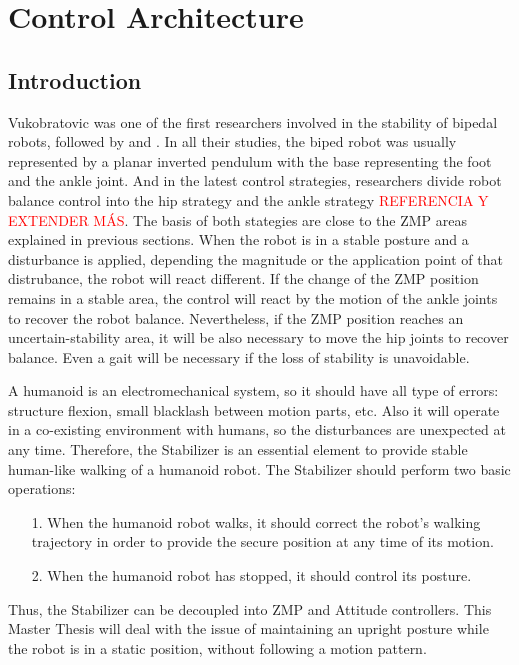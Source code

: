 \chapter{Control Architecture}
\section{Introduction}
Vukobratovic \cite{Vuk1970} was one of the first researchers involved in the stability of bipedal robots, followed by \cite{Kaj2001} and \cite{Kim2004}. In all their studies, the biped robot was usually represented by a planar inverted pendulum with the base representing the foot and the ankle joint. And in the latest control strategies, researchers divide robot balance control into the hip strategy and the ankle strategy \textcolor{red}{REFERENCIA Y EXTENDER MÁS}. The basis of both stategies are close to the ZMP areas explained in previous sections. When the robot is in a stable posture and a disturbance is applied, depending the magnitude or the application point of that distrubance, the robot will react different. If the change of the ZMP position remains in a stable area, the control will react by the motion of the ankle joints to recover the robot balance. Nevertheless, if the ZMP position reaches an uncertain-stability area, it will be also necessary to move the hip joints to recover balance. Even a gait will be necessary if the loss of stability is unavoidable. 

A humanoid is an electromechanical system, so it should have all type of errors: structure flexion, small blacklash between motion parts, etc. Also it will operate in a co-existing environment with humans, so the disturbances are unexpected at any time. Therefore, the Stabilizer is an essential element to provide stable human-like walking of a humanoid robot. The Stabilizer should perform two basic operations:
\begin{itemize}
\item[1.] When the humanoid robot walks, it should correct the robot’s walking trajectory in order to provide the secure position at any time of its motion.
\item[2.] When the humanoid robot has stopped, it should control its posture.
\end{itemize}

Thus, the Stabilizer can be decoupled into ZMP and Attitude controllers. This Master Thesis will deal with the issue of maintaining an upright posture while the robot is in a static position, without following a motion pattern.


